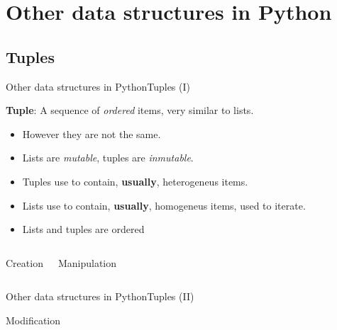 \documentclass[10pt,compress]{beamer} %
\begin{document}
\section{Other data structures in Python}
\subsection{Tuples}
\begin{frame}{Other data structures in Python}{Tuples (I)}

	\textbf{Tuple}: A sequence of \textit{ordered} items, very similar to lists.
		\begin{itemize}
		\item \small However they are not the same.
		\item \small Lists are \textit{mutable}, tuples are \textit{inmutable}.
		\item \small Tuples use to contain, \textbf{usually}, heterogeneus items.
		\item \small Lists use to contain, \textbf{usually}, homogeneus items, used to iterate.
        \item Lists and tuples are ordered
		\end{itemize}
	
	    \begin{columns}
 	   \scriptsize{
		\begin{block}{Creation}
		\vspace{-0.2cm}
		
		\vspace{-0.2cm}
		\end{block}
		}
       \vspace{4cm}
 	   \scriptsize{
		\begin{block}{Manipulation}
		\vspace{-0.2cm}
		
		\vspace{-0.3cm}	
		\end{block}
		}
		\vspace{2.9 cm}

	\end{columns}
\end{frame}

\begin{frame}{Other data structures in Python}{Tuples (II)}
 	  \vspace{-0.2cm}
 	   \tiny{
		\begin{block}{\scriptsize{Modification}}
		
		\vspace{-0.2cm}
		
		\vspace{-0.2cm}
		
		\end{block}
   }
\end{frame}
\end{document}
